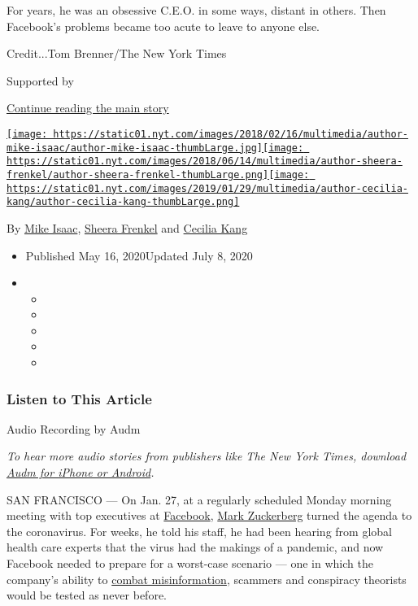 For years, he was an obsessive C.E.O. in some ways, distant in others.
Then Facebook's problems became too acute to leave to anyone else.

Credit...Tom Brenner/The New York Times

Supported by

\protect\hyperlink{after-sponsor}{Continue reading the main story}

\href{https://www.nytimes.com/by/mike-isaac}{\texttt{[image: https://static01.nyt.com/images/2018/02/16/multimedia/author-mike-isaac/author-mike-isaac-thumbLarge.jpg]}}\href{https://www.nytimes.com/by/sheera-frenkel}{\texttt{[image: https://static01.nyt.com/images/2018/06/14/multimedia/author-sheera-frenkel/author-sheera-frenkel-thumbLarge.png]}}\href{https://www.nytimes.com/by/cecilia-kang}{\texttt{[image: https://static01.nyt.com/images/2019/01/29/multimedia/author-cecilia-kang/author-cecilia-kang-thumbLarge.png]}}

By \href{https://www.nytimes.com/by/mike-isaac}{Mike Isaac},
\href{https://www.nytimes.com/by/sheera-frenkel}{Sheera Frenkel} and
\href{https://www.nytimes.com/by/cecilia-kang}{Cecilia Kang}

\begin{itemize}
\item
  Published May 16, 2020Updated July 8, 2020
\item
  \begin{itemize}
  \item
  \item
  \item
  \item
  \item
  \end{itemize}
\end{itemize}

\hypertarget{listen-to-this-article}{%
\subsubsection{Listen to This Article}\label{listen-to-this-article}}

Audio Recording by Audm

\emph{To hear more audio stories from publishers like The New York
Times, download}
\href{https://www.audm.com/?utm_source=nyt\&utm_medium=embed\&utm_campaign=facebook_zuckerberg_production}{\emph{Audm
for iPhone or Android}}\emph{.}

SAN FRANCISCO --- On Jan. 27, at a regularly scheduled Monday morning
meeting with top executives at
\href{https://www.nytimes.com/2020/05/21/technology/facebook-remote-work-coronavirus.html}{Facebook},
\href{https://www.nytimes.com/2020/06/02/technology/zuckerberg-defends-facebook-trump-posts.html}{Mark
Zuckerberg} turned the agenda to the coronavirus. For weeks, he told his
staff, he had been hearing from global health care experts that the
virus had the makings of a pandemic, and now Facebook needed to prepare
for a worst-case scenario --- one in which the company's ability to
\href{https://www.nytimes.com/2020/03/08/technology/coronavirus-misinformation-social-media.html}{combat
misinformation}, scammers and conspiracy theorists would be tested as
never before.

